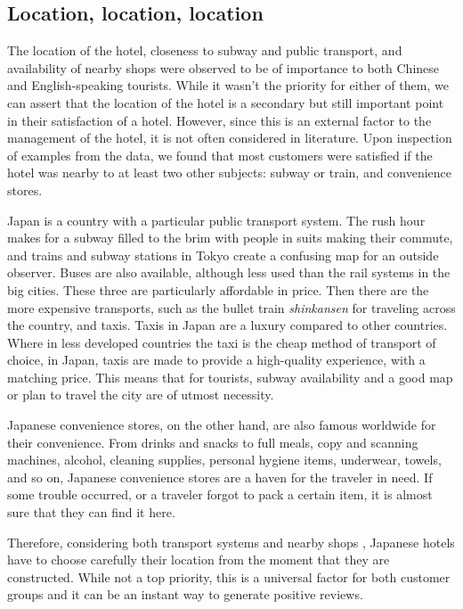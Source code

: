 \subsection{Location, location, location}\label{disc:location}

The location of the hotel, closeness to \DIFaddbegin {}\DIFaddend subway and public transport, and availability of nearby shops were observed to be of importance to both Chinese and English-speaking tourists. While it wasn't the \DIFaddbegin {}\DIFaddend priority for either of them, we can assert that the location of the hotel is a secondary but still important point in their satisfaction of a hotel. However, since this is an external factor to the management of the hotel, it is not often considered in literature. Upon inspection of examples from the data, we found that most customers were satisfied if the hotel was nearby to at least two other subjects: subway or train, and convenience stores. 

Japan is a country with a particular public transport system. The rush hour makes for a subway filled to the brim with people in suits making their commute, and trains and subway stations in Tokyo create a confusing \DIFaddbegin {}\DIFaddend map for an outside observer. Buses are also available, although less used than the rail systems in the big cities. These three are particularly affordable in price. Then there are the more expensive transports, such as the bullet train \textit{shinkansen} for traveling across the country, and taxis. Taxis in Japan are a luxury compared to other countries. Where in less developed countries the taxi is the cheap method of transport of choice, in Japan, taxis are made to provide a high-quality experience, with a matching price. This means that for tourists, subway availability and a good map or plan to travel the city are of utmost necessity.

Japanese convenience stores, on the other hand, are also famous worldwide for their convenience. From drinks and snacks to full meals, copy and scanning machines, alcohol, cleaning supplies, personal hygiene items, underwear, towels, \DIFaddbegin {}\DIFaddend and so on, Japanese convenience stores are a haven for the traveler in need. If some trouble occurred, or a traveler forgot to pack a certain item, it is almost sure that they can find it here.

Therefore, considering both transport systems and nearby shops \DIFaddbegin {}\DIFaddend , Japanese hotels have to choose carefully their location from the moment that they are constructed. While not a top priority, this is a universal factor for both customer groups and it can be an instant way to generate positive reviews.

